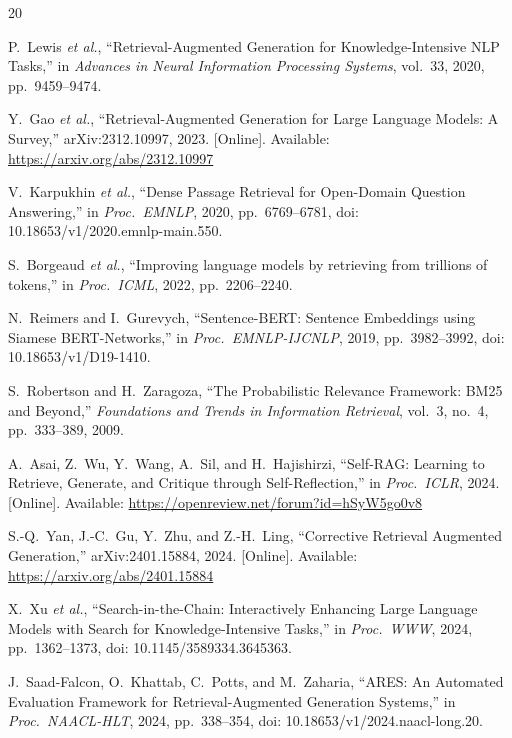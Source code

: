 \documentclass[conference]{IEEEtran}
\begin{document}
\begin{thebibliography}{20}

P.~Lewis \emph{et al.}, ``Retrieval-Augmented Generation for Knowledge-Intensive
NLP Tasks,'' in \emph{Advances in Neural Information Processing Systems},
vol.~33, 2020, pp.~9459--9474.

Y.~Gao \emph{et al.}, ``Retrieval-Augmented Generation for Large Language
Models: A Survey,'' arXiv:2312.10997, 2023. [Online]. Available:
\url{https://arxiv.org/abs/2312.10997}

V.~Karpukhin \emph{et al.}, ``Dense Passage Retrieval for Open-Domain Question
Answering,'' in \emph{Proc.\ EMNLP}, 2020, pp.~6769--6781,
doi: 10.18653/v1/2020.emnlp-main.550.

S.~Borgeaud \emph{et al.}, ``Improving language models by retrieving from
trillions of tokens,'' in \emph{Proc.\ ICML}, 2022, pp.~2206--2240.

N.~Reimers and I.~Gurevych, ``Sentence-BERT: Sentence Embeddings using Siamese
BERT-Networks,'' in \emph{Proc.\ EMNLP-IJCNLP}, 2019, pp.~3982--3992,
doi: 10.18653/v1/D19-1410.

S.~Robertson and H.~Zaragoza, ``The Probabilistic Relevance Framework: BM25 and Beyond,''
\emph{Foundations and Trends in Information Retrieval}, vol.~3, no.~4, pp.~333--389, 2009.

A.~Asai, Z.~Wu, Y.~Wang, A.~Sil, and H.~Hajishirzi, ``Self-RAG: Learning to
Retrieve, Generate, and Critique through Self-Reflection,'' in \emph{Proc.\
ICLR}, 2024. [Online]. Available:
\url{https://openreview.net/forum?id=hSyW5go0v8}

S.-Q.~Yan, J.-C.~Gu, Y.~Zhu, and Z.-H.~Ling, ``Corrective Retrieval Augmented
Generation,'' arXiv:2401.15884, 2024. [Online]. Available:
\url{https://arxiv.org/abs/2401.15884}

X.~Xu \emph{et al.}, ``Search-in-the-Chain: Interactively Enhancing Large
Language Models with Search for Knowledge-Intensive Tasks,'' in \emph{Proc.\
WWW}, 2024, pp.~1362--1373, doi: 10.1145/3589334.3645363.

J.~Saad-Falcon, O.~Khattab, C.~Potts, and M.~Zaharia, ``ARES: An Automated
Evaluation Framework for Retrieval-Augmented Generation Systems,'' in
\emph{Proc.\ NAACL-HLT}, 2024, pp.~338--354,
doi: 10.18653/v1/2024.naacl-long.20.


\end{thebibliography}
\end{document}
